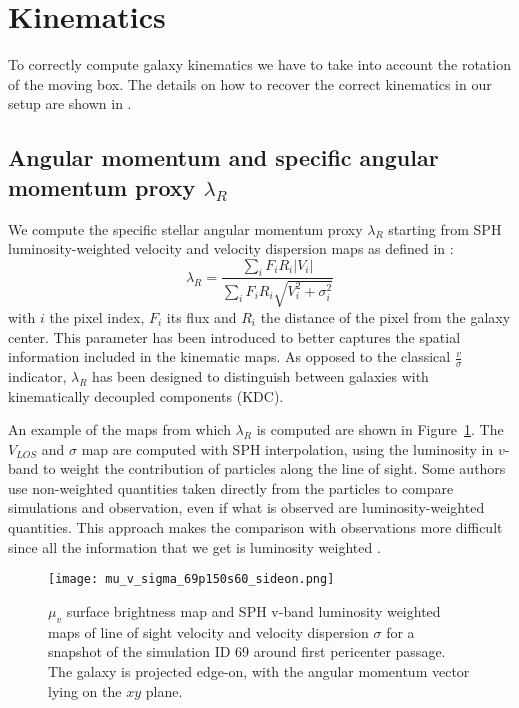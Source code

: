 
\section{Kinematics}
To correctly compute galaxy kinematics we have to take into account the rotation of the moving box.
The details on how to recover the correct kinematics in our setup are shown in .

\subsection{Angular momentum and specific angular momentum proxy $\lambda_R$}
We compute the specific stellar angular momentum proxy $\lambda_R$ starting from SPH luminosity-weighted velocity and velocity dispersion maps as defined in \citet{Emsellem2007}: %
\begin{equation}
    \lambda_R = \dfrac{\sum_i F_i R_i |V_i|}{\sum_i F_i R_i \sqrt{V_i^2 + \sigma_i^2}}
\end{equation}
with $i$ the pixel index, $F_i$ its flux and $R_i$ the distance of the pixel from the galaxy center.
This parameter has been introduced to better captures the spatial information included in the kinematic maps.
As opposed to the classical $\frac{v}{\sigma}$ indicator, $\lambda_R$ has been designed to distinguish between galaxies with kinematically decoupled components (KDC).

An example of the maps from which $\lambda_R$ is computed are shown in Figure~\ref{fig:maps_lambda_r}.
The $V_{LOS}$ and $\sigma$ map are computed with SPH interpolation, using the luminosity in $v$-band to weight the contribution of particles along the line of sight.
Some authors \citep[e.g.][]{Schulze2018,Pillepich2019} use non-weighted quantities taken directly from the particles to compare simulations and observation, even if what is observed are luminosity-weighted quantities.
This approach makes the comparison with observations more difficult since all the information that we get is luminosity weighted \citep{Walo-Martin2020}.

\begin{figure}
\centering
\texttt{[image: mu\_v\_sigma\_69p150s60\_sideon.png]}
\caption{$\mu_v$ surface brightness map and SPH v-band luminosity weighted maps of line of sight velocity and velocity dispersion $\sigma$ for a snapshot of the simulation ID 69 around first pericenter passage.
The galaxy is projected edge-on, with the angular momentum vector lying on the $xy$ plane.}
\label{fig:maps_lambda_r}
\end{figure}

